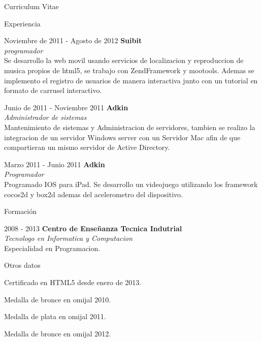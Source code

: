 \documentclass[letterpaper,12pt]{article}
\begin{document}
\begin{cv}{Curriculum Vitae}
\begin{cvlist}{Experiencia}

        \item[Noviembre de 2011 - Agosto de 2012] \textbf{Suibit}\\
                \emph{programador}\\
                 Se desarrollo la web movil usando servicios de localizacion y reproduccion de musica propios de html5, se trabajo con ZendFramework y mootools. Ademas se implemento el registro de usuarios de manera interactiva junto con un tutorial en formato de carrusel interactivo.

        \item[Junio  de 2011 - Noviembre 2011] \textbf{Adkin}\\
                \emph{Administrador de sistemas}\\
                Mantenimiento de sistemas y Administracion de servidores, tambien se realizo la integracion de un servidor Windows server con un Servidor Mac afin de que compartieran un mismo servidor de Active Directory.
                
         \item[Marzo 2011 - Junio 2011] \textbf{Adkin}\\
                \emph{Programador}\\
                Programado IOS para iPad. Se desarrollo un videojuego utilizando los framework cocos2d y box2d ademas del acelerometro del dispositivo.

\end{cvlist}

\begin{cvlist}{Formación}

        \item[2008 - 2013] \textbf{Centro de Enseñanza Tecnica Indutrial}\\
                \emph{Tecnologo en Informatica y Computacion}\\
                Especialidad en Programacion.


\end{cvlist}

\begin{cvlist}{Otros datos}
        \item Certificado en HTML5 desde enero de 2013.
        \item Medalla de bronce en omijal 2010.
        \item Medalla de plata en omijal 2011.
        \item Medalla de bronce en omijal 2012.
\end{cvlist}

\end{cv}
\end{document}
